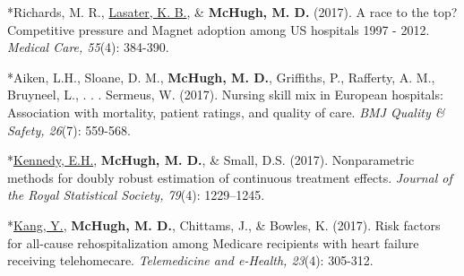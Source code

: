 \documentclass[10pt,]{article}
\begin{document}
{{{{{{{{{{{{{{\begin{hangparas}{.25in}{1}
\end{hangparas}

\vspace{4mm}

\begin{hangparas}{.25in}{1}

*Richards, M. R., {\underline {Lasater, K. B.}}, \& {\textbf {McHugh, M. D.}} (2017). A race to the top? Competitive pressure and Magnet adoption among US hospitals 1997 - 2012. {\textit {Medical Care, 55}}(4): 384-390.

\end{hangparas}

\vspace{4mm}

\begin{hangparas}{.25in}{1}

*Aiken, L.H., Sloane, D. M., {\textbf {McHugh, M. D.}}, Griffiths, P., Rafferty, A. M., Bruyneel, L., . . . Sermeus, W. (2017). Nursing skill mix in European hospitals: Association with mortality, patient ratings, and quality of care. {\textit {BMJ Quality \& Safety, 26}}(7): 559-568.

\end{hangparas}

\vspace{4mm}

\begin{hangparas}{.25in}{1}

*{\underline {Kennedy, E.H.}}, {\textbf {McHugh, M. D.}}, \& Small, D.S. (2017). Nonparametric methods for doubly robust estimation of continuous treatment effects. {\textit {Journal of the Royal Statistical Society, 79}}(4): 1229–1245.

\end{hangparas}

\vspace{4mm}

\begin{hangparas}{.25in}{1}

*{\underline {Kang, Y.}}, {\textbf {McHugh, M. D.}}, Chittams, J., \& Bowles, K. (2017). Risk factors for all-cause rehospitalization among Medicare recipients with heart failure receiving telehomecare. {\textit {Telemedicine and e-Health, 23}}(4): 305-312.

\end{hangparas}

\vspace{4mm}

\begin{hangparas}{.25in}{1}


\end{hangparas}}}}}}}}}}}}}}}
\end{document}
